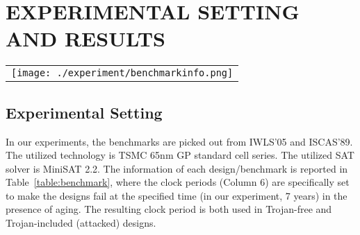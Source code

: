 \section{EXPERIMENTAL SETTING AND RESULTS}
\label{sec:mot}

\begin{table*}
\centering
\caption{Benchmark information and average probabilities of Monte-Carlo instances}
	\begin{tabular}{l}
	\texttt{[image: ./experiment/benchmarkinfo.png]}
	\end{tabular}
\label{table:benchmark}
\end{table*}

\begin{figure*}[!ht]
    \centering
    \caption{Lifetime distributions of Monte-Carlo Instances of Trojan-included \textit{s38417}, \textit{des\_perf}, and \textit{leo3mp}}
    \label{fig:exp}
\end{figure*}

\subsection{Experimental Setting}
\label{sec:exp:tc}
In our experiments, the benchmarks are picked out from IWLS'05 and ISCAS'89. The utilized technology is TSMC 65nm GP standard cell series. The utilized SAT solver is MiniSAT 2.2. The information of each design/benchmark is reported in Table~\ref{table:benchmark}, where the clock periods (Column 6) are specifically set to make the designs fail at the specified time (in our experiment, 7 years) in the presence of aging. The resulting clock period is both used in Trojan-free and Trojan-included (attacked) designs. 
